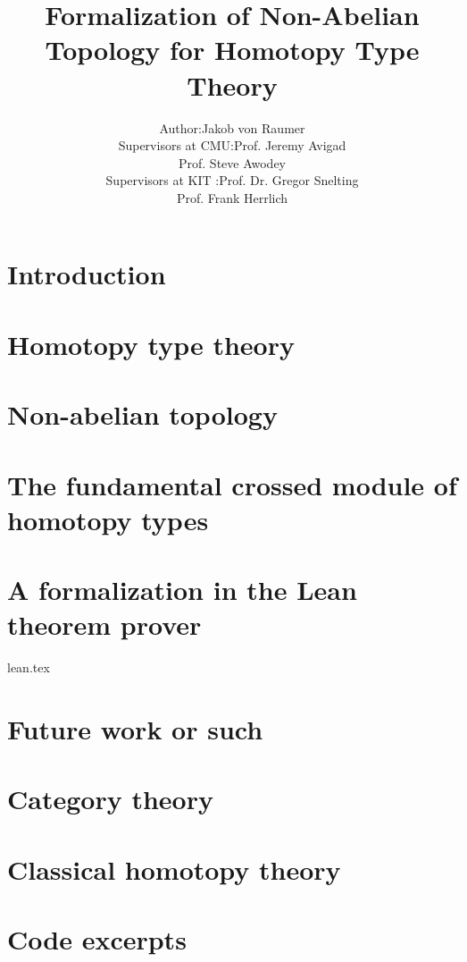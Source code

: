\documentclass[12pt]{report}
\theoremstyle{definition}
\begin{document}
\title{Formalization of Non-Abelian Topology for Homotopy Type Theory}
\author{\begin{tabular}{r@{ }l} 
Author:      & Jakob von Raumer \\[1ex] 
Supervisors at CMU: & Prof. Jeremy Avigad\\
             & Prof. Steve Awodey \\
Supervisors at KIT : & Prof. Dr. Gregor Snelting\\
			& Prof. Frank Herrlich
\end{tabular}}

\maketitle

\tableofcontents

\chapter{Introduction}



\chapter{Homotopy type theory}



\chapter{Non-abelian topology}

 

\chapter{The fundamental crossed module of homotopy types}



\chapter{A formalization in the Lean theorem prover}

 {lean.tex}

\chapter{Future work or such}




\appendix

\chapter{Category theory}

\chapter{Classical homotopy theory}

\chapter{Code excerpts}
\end{document}
